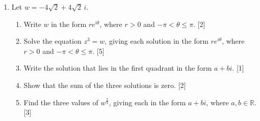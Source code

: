 \documentclass[12pt, twoside]{article}
\begin{document}
\begin{enumerate}[itemsep=0.15cm]
\item[5.] [Maximum mark: 13]

Let $w = -4\sqrt{2} + 4\sqrt{2}\,i$.

\begin{enumerate}[itemsep=0.15cm]
  \item Write $w$ in the form $re^{i\theta}$, where $r > 0$ and
  $-\pi < \theta \leq \pi$. \hfill [2]
  \item Solve the equation $z^{3} = w$, giving each solution in the form
  $re^{i\theta}$, where $r > 0$ and $-\pi < \theta \leq \pi$. \hfill [5]
  \item Write the solution that lies in the first quadrant in the form
  $a + bi$. \hfill [1]
  \item Show that the sum of the three solutions is zero. \hfill [2]
  \item Find the three values of $w^{\frac{2}{3}}$, giving each in the form
  $a + bi$, where $a, b \in \mathbb{R}$. \hfill [3]
\end{enumerate}

\end{enumerate}
\end{document}

